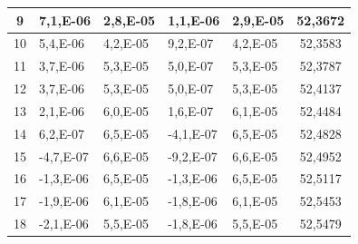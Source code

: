 \begin{table}[]
\begin{tabular}{|c|l|l|l|l|c|}
{\color[HTML]{000000} 9}       & {\color[HTML]{000000} 7,1,E-06}    & {\color[HTML]{000000} 2,8,E-05}    & {\color[HTML]{000000} 1,1,E-06}    & {\color[HTML]{000000} 2,9,E-05}       & {\color[HTML]{000000} 52,3672} \\ \hline
{\color[HTML]{000000} 10}      & {\color[HTML]{000000} 5,4,E-06}    & {\color[HTML]{000000} 4,2,E-05}    & {\color[HTML]{000000} 9,2,E-07}    & {\color[HTML]{000000} 4,2,E-05}       & {\color[HTML]{000000} 52,3583} \\ \hline
{\color[HTML]{000000} 11}      & {\color[HTML]{000000} 3,7,E-06}    & {\color[HTML]{000000} 5,3,E-05}    & {\color[HTML]{000000} 5,0,E-07}    & {\color[HTML]{000000} 5,3,E-05}       & {\color[HTML]{000000} 52,3787} \\ \hline
{\color[HTML]{000000} 12}      & {\color[HTML]{000000} 3,7,E-06}    & {\color[HTML]{000000} 5,3,E-05}    & {\color[HTML]{000000} 5,0,E-07}    & {\color[HTML]{000000} 5,3,E-05}       & {\color[HTML]{000000} 52,4137} \\ \hline
{\color[HTML]{000000} 13}      & {\color[HTML]{000000} 2,1,E-06}    & {\color[HTML]{000000} 6,0,E-05}    & {\color[HTML]{000000} 1,6,E-07}    & {\color[HTML]{000000} 6,1,E-05}       & {\color[HTML]{000000} 52,4484} \\ \hline
{\color[HTML]{000000} 14}      & {\color[HTML]{000000} 6,2,E-07}    & {\color[HTML]{000000} 6,5,E-05}    & {\color[HTML]{000000} -4,1,E-07}   & {\color[HTML]{000000} 6,5,E-05}       & {\color[HTML]{000000} 52,4828} \\ \hline
{\color[HTML]{000000} 15}      & {\color[HTML]{000000} -4,7,E-07}   & {\color[HTML]{000000} 6,6,E-05}    & {\color[HTML]{000000} -9,2,E-07}   & {\color[HTML]{000000} 6,6,E-05}       & {\color[HTML]{000000} 52,4952} \\ \hline
{\color[HTML]{000000} 16}      & {\color[HTML]{000000} -1,3,E-06}   & {\color[HTML]{000000} 6,5,E-05}    & {\color[HTML]{000000} -1,3,E-06}   & {\color[HTML]{000000} 6,5,E-05}       & {\color[HTML]{000000} 52,5117} \\ \hline
{\color[HTML]{000000} 17}      & {\color[HTML]{000000} -1,9,E-06}   & {\color[HTML]{000000} 6,1,E-05}    & {\color[HTML]{000000} -1,8,E-06}   & {\color[HTML]{000000} 6,1,E-05}       & {\color[HTML]{000000} 52,5453} \\ \hline
{\color[HTML]{000000} 18}      & {\color[HTML]{000000} -2,1,E-06}   & {\color[HTML]{000000} 5,5,E-05}    & {\color[HTML]{000000} -1,8,E-06}   & {\color[HTML]{000000} 5,5,E-05}       & {\color[HTML]{000000} 52,5479} \\ \hline

\end{tabular}
\end{table}

